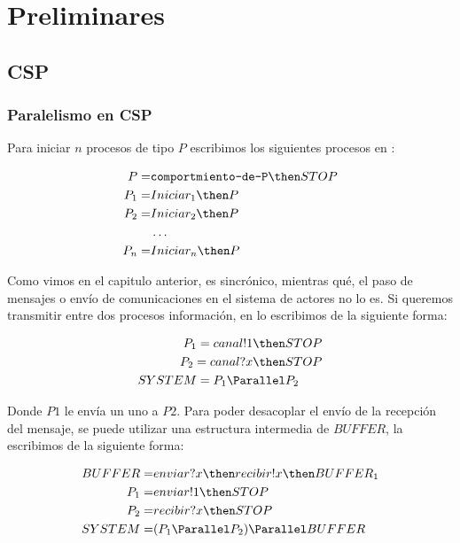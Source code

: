 \chapter{Preliminares}

\section{CSP}

\subsection{Paralelismo en CSP}

Para iniciar $n$ procesos de tipo $P$ escribimos los siguientes procesos en \CSP:

\begin{align*}
P =& \texttt{comportmiento-de-P} \then STOP \\
P_1 =& Iniciar_1 \then P \\
P_2 =& Iniciar_2 \then P \\
&\ldots \\
P_n =& Iniciar_n \then P \\
\end{align*}

Como vimos en el capitulo anterior, \CSP es sincrónico, mientras qué, el paso de mensajes o envío de comunicaciones en el sistema de actores no lo es. Si queremos transmitir entre dos procesos información, en \CSP lo escribimos de la siguiente forma:

\begin{align*}
P_1 = canal!1 \then& STOP \\
P_2 = canal?x \then& STOP \\
SYSTEM = P_1 \Parallel& P_2 \\
\end{align*}

Donde $P1$ le envía un uno a $P2$. Para poder desacoplar el envío de la recepción del mensaje, se puede utilizar una estructura intermedia de $BUFFER$, la escribimos de la siguiente forma:

\begin{align*}
BUFFER =& enviar?x \then recibir!x \then BUFFER_1 \\
P_1 =& enviar!1 \then STOP \\
P_2 =& recibir?x \then STOP \\
SYSTEM =& ( P_1 \Parallel P_2 ) \Parallel BUFFER \\
\end{align*}

